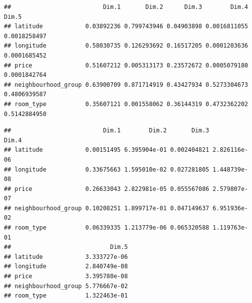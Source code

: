 \documentclass[
]{article}
\newenvironment{Shaded}{\begin{snugshade}}{\end{snugshade}}
\newcommand{\CommentTok}[1]{\textcolor[rgb]{0.56,0.35,0.01}{\textit{#1}}}
\newcommand{\KeywordTok}[1]{\textcolor[rgb]{0.13,0.29,0.53}{\textbf{#1}}}
\newcommand{\NormalTok}[1]{#1}
\newcommand{\OperatorTok}[1]{\textcolor[rgb]{0.81,0.36,0.00}{\textbf{#1}}}
\begin{document}
\begin{Shaded}
\end{Shaded}

\begin{verbatim}
##                          Dim.1       Dim.2      Dim.3        Dim.4        Dim.5
## latitude            0.03892236 0.799743946 0.04903898 0.0016811055 0.0018258497
## longitude           0.58030735 0.126293692 0.16517205 0.0001203636 0.0001685452
## price               0.51607212 0.005313173 0.23572672 0.0005079180 0.0001842764
## neighbourhood_group 0.63900709 0.871714919 0.43427934 0.5273304673 0.4806939587
## room_type           0.35607121 0.001558062 0.36144319 0.4732362202 0.5142884950
\end{verbatim}

\begin{Shaded}
\end{Shaded}

\begin{verbatim}
##                          Dim.1        Dim.2       Dim.3        Dim.4
## latitude            0.00151495 6.395904e-01 0.002404821 2.826116e-06
## longitude           0.33675663 1.595010e-02 0.027281805 1.448739e-08
## price               0.26633043 2.822981e-05 0.055567086 2.579807e-07
## neighbourhood_group 0.10208251 1.899717e-01 0.047149637 6.951936e-02
## room_type           0.06339335 1.213779e-06 0.065320588 1.119763e-01
##                            Dim.5
## latitude            3.333727e-06
## longitude           2.840749e-08
## price               3.395780e-08
## neighbourhood_group 5.776667e-02
## room_type           1.322463e-01
\end{verbatim}

\begin{Shaded}
\end{Shaded}
\end{document}
